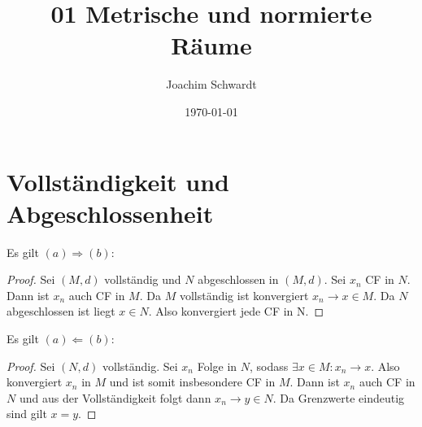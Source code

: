 \documentclass[a4paper,12pt]{article}
\begin{document}
\title{01 Metrische und normierte Räume}
\author{Joachim Schwardt}
\date{\today}
\maketitle

\section{Vollständigkeit und Abgeschlossenheit}
Es gilt $(a)\Rightarrow(b)$:
\begin{proof}
Sei $(M, d)$ vollständig und $N$ abgeschlossen in $(M,d)$. Sei $x_n$ CF in $N$. Dann ist $x_n$ auch CF in $M$. Da $M$ vollständig ist konvergiert $x_n\rightarrow x\in M$. Da $N$ abgeschlossen ist liegt $x\in N$. Also konvergiert jede CF in N.
\end{proof}
Es gilt $(a)\Leftarrow(b)$:
\begin{proof}
Sei $(N,d)$ vollständig. Sei $x_n$ Folge in $N$, sodass $\exists x\in M:x_n\rightarrow x$. Also konvergiert $x_n$ in $M$ und ist somit insbesondere CF in $M$. Dann ist $x_n$ auch CF in $N$ und aus der Vollständigkeit folgt dann $x_n\rightarrow y\in N$. Da Grenzwerte eindeutig sind gilt $x=y$.
\end{proof}
\end{document}
